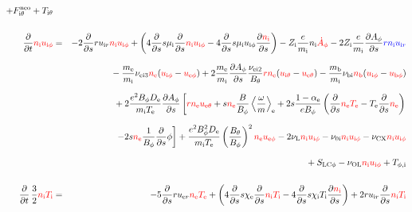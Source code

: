 \documentclass[11pt]{article}
\def\r#1{{\rm#1}}
\def\ddt{\frac{\partial}{\partial t}}
\def\dds{\frac{\partial}{\partial s}}
\def\dd#1{\frac{\partial #1}{\partial s}}
\def\ave#1{\left\langle#1\right\rangle}
\def\me{m_\r{e}}
\def\mi{m_\r{i}}
\def\mb{m_\r{b}}
\def\mui{\mu_\r{i}}
\def\De{D_\r{e}}
\def\Di{D_\r{i}}
\def\chie{\chi_\r{e}}
\def\chii{\chi_\r{i}}
\def\nee{n_\r{e}}
\def\ni{n_\r{i}}
\def\nb{n_\r{b}}
\def\uer{u_{\r{e}r}}
\def\uir{u_{\r{i}r}}
\def\ueth{u_{\r{e}\theta}}
\def\uith{u_{\r{i}\theta}}
\def\ueph{u_{\r{e}\phi}}
\def\uiph{u_{\r{i}\phi}}
\def\ubph{u_{\r{b}\phi}}
\def\Bth{B_\theta}
\def\Bph{B_\phi}
\def\Aphd{\dot{A}_\phi}
\def\Aph{A_\phi}
\def\Te{T_\r{e}}
\def\Ti{T_\r{i}}
\def\Zi{Z_\r{i}}
\def\nubi{\nu_\r{bi}}
\def\nuni{\nu_\r{0i}}
\def\nuL{\nu_\r{L}}
\def\nuCX{\nu_\r{CX}}
\def\nuOL{\nu_\r{OL}}
\def\red#1{\textcolor{red}{#1}}
\def\blue#1{\textcolor{blue}{#1}}
\begin{document}
\begin{eqnarray}
%
%
%
  + F_{\r{i}\theta}^\r{neo}
%
  + T_{\r{i}\theta}
\\[5mm]
  \ddt \red{\ni \uiph} &=&
%
  - 2 \dds r \uir \red{\ni \uiph}
%
  + \left(   4 \dds s \mui \dds \red{\ni \uiph}
%
           - 4 \dds s \mui \uiph \dd{\red{\ni}} \right)
%
  - \Zi \frac{e}{\mi} \ni \red{\Aphd}
%
  - 2 \Zi \frac{e}{\mi} \dd{\Aph} \blue{r \ni \uir} 
\nonumber\\[2.5mm]&&{}
%
  - \frac{\me}{\mi} \nu_\r{ei3} \red{\nee} (\red{\uiph} - \red{\ueph})
%
  + 2 \frac{\me}{\mi} \dd{\Aph} \frac{\nu_\r{ei2}}{\Bth} \red{r \nee} (\red{\uith} - \red{\ueth})
%
  - \frac{\mb}{\mi} \nubi \red{\nb} (\red{\uiph} - \red{\ubph})
\nonumber\\[2.5mm]&&{}
%
  + 2\frac{e^2 \Bph \De}{\mi\Te}\dd{\Aph}\left[
     \red{r\nee\ueth} + s \red{\nee}\frac{B}{\Bph}\ave{\frac{\omega}{m}}_\r{e}
     + 2 s \frac{1-\alpha_\r{e}}{e\Bph} \left(\dds \red{\nee\Te} - \Te
					 \dds \red{\nee}\right) \right.
\nonumber\\[2.5mm]&&{}
%
     \left.- 2 s \red{\nee}\frac{1}{\Bph} \dds \phi \right]
%
  + \frac{e^2 \Bph^2
  \De}{\mi\Te}\left(\frac{\Bth}{\Bph}\right)^2\red{\nee\ueph}
%
%
%
  - 2 \nuL \red{\ni \uiph}
%
  - \nuni \red{\ni \uiph}
%
  - \nuCX \red{\ni \uiph}
\nonumber\\[2.5mm]&&{}
%
  + S_\r{LC\phi}
%
  - \nuOL \red{\ni \uiph}
%
  + T_{\phi,\r{i}}
%
%
\\[5mm]
  \ddt \, \frac{3}{2} \red{\ni \Ti} &=&
%
  - 5 \dds r \uer \red{\nee \Te}
%
  + \left(   4 \dds s \chie \dds \red{\ni \Ti} 
%
           - 4 \dds s \chii \Ti \dd{\red{\ni}} \right)
%
  + 2 r \uir \dds \red{\ni \Ti}
%
\nonumber\\[2.5mm]&&{}

\end{eqnarray}
\end{document}
